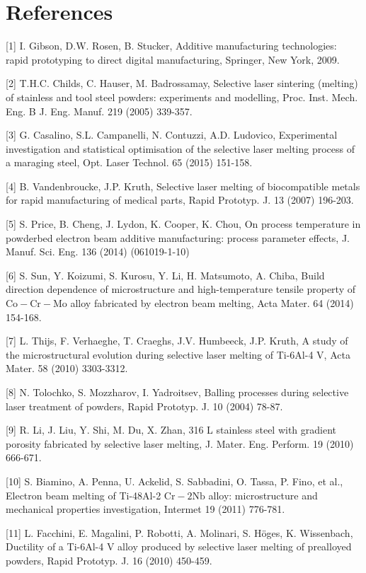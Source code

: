\documentclass[10pt]{article}
\begin{document}
\section*{References}
[1] I. Gibson, D.W. Rosen, B. Stucker, Additive manufacturing technologies: rapid prototyping to direct digital manufacturing, Springer, New York, 2009.

[2] T.H.C. Childs, C. Hauser, M. Badrossamay, Selective laser sintering (melting) of stainless and tool steel powders: experiments and modelling, Proc. Inst. Mech. Eng. B J. Eng. Manuf. 219 (2005) 339-357.

[3] G. Casalino, S.L. Campanelli, N. Contuzzi, A.D. Ludovico, Experimental investigation and statistical optimisation of the selective laser melting process of a maraging steel, Opt. Laser Technol. 65 (2015) 151-158.

[4] B. Vandenbroucke, J.P. Kruth, Selective laser melting of biocompatible metals for rapid manufacturing of medical parts, Rapid Prototyp. J. 13 (2007) 196-203.

[5] S. Price, B. Cheng, J. Lydon, K. Cooper, K. Chou, On process temperature in powderbed electron beam additive manufacturing: process parameter effects, J. Manuf. Sci. Eng. 136 (2014) (061019-1-10)

[6] S. Sun, Y. Koizumi, S. Kurosu, Y. Li, H. Matsumoto, A. Chiba, Build direction dependence of microstructure and high-temperature tensile property of $\mathrm{Co}-\mathrm{Cr}-\mathrm{Mo}$ alloy fabricated by electron beam melting, Acta Mater. 64 (2014) 154-168.

[7] L. Thijs, F. Verhaeghe, T. Craeghs, J.V. Humbeeck, J.P. Kruth, A study of the microstructural evolution during selective laser melting of Ti-6Al-4 V, Acta Mater. 58 (2010) 3303-3312.

[8] N. Tolochko, S. Mozzharov, I. Yadroitsev, Balling processes during selective laser treatment of powders, Rapid Prototyp. J. 10 (2004) 78-87.

[9] R. Li, J. Liu, Y. Shi, M. Du, X. Zhan, 316 L stainless steel with gradient porosity fabricated by selective laser melting, J. Mater. Eng. Perform. 19 (2010) 666-671.

[10] S. Biamino, A. Penna, U. Ackelid, S. Sabbadini, O. Tassa, P. Fino, et al., Electron beam melting of Ti-48Al-2 $\mathrm{Cr}-2 \mathrm{Nb}$ alloy: microstructure and mechanical properties investigation, Intermet 19 (2011) 776-781.

[11] L. Facchini, E. Magalini, P. Robotti, A. Molinari, S. Höges, K. Wissenbach, Ductility of a Ti-6Al-4 V alloy produced by selective laser melting of prealloyed powders, Rapid Prototyp. J. 16 (2010) 450-459.
\end{document}
